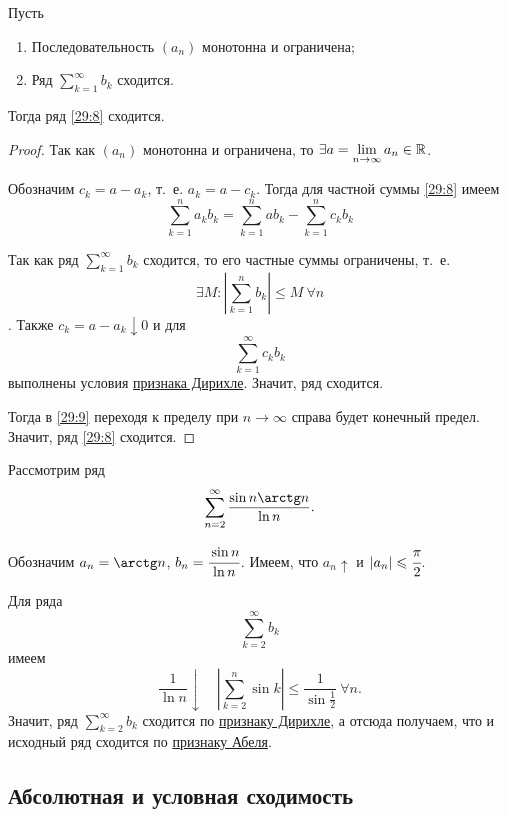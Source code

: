\documentclass[../../main.tex]{subfiles}
\begin{document}
	\begin{thm}
		\label{29:abel}
		Пусть
		\begin{enumerate}
			\item Последовательность $(a_n)$ монотонна и ограничена;
			\item Ряд $\sum\limits_{k = 1}^\infty b_k$ сходится.
		\end{enumerate}
	
		Тогда ряд \eqref{29:8} сходится.
	\end{thm}
	\begin{proof}
		Так как $(a_n)$ монотонна и ограничена, то $\exists a = 
		\lim\limits_{n\to\infty} a_n\in \R$.
		
		Обозначим $c_k = a - a_k$, т.~е. $a_k = a - c_k$. 
		Тогда для частной суммы \eqref{29:8} имеем
		\begin{equation}
			\sum_{k = 1}^n a_kb_k = \sum_{k = 1}^n ab_k - \sum_{k = 1}^n c_kb_k
			\label{29:9}
		\end{equation}
		
		Так как ряд $\sum\limits_{k = 1}^\infty b_k$ сходится, 
		то его частные суммы ограничены, т.~е. 
		\[\exists M\colon \left|\sum\limits_{k = 1}^n b_k\right|\leq M \ 
		\forall n\]. 
		Также $c_k = a - a_k \downarrow 0$ и для 
		\[\sum_{k = 1}^\infty c_kb_k\]
		выполнены условия \hyperref[29:dirichle]{признака Дирихле}. 
		Значит, ряд сходится.
		
		Тогда в \eqref{29:9} переходя к пределу при $n\to\infty$ 
		справа будет конечный предел. Значит, ряд \eqref{29:8} сходится.
	\end{proof}
	\begin{example}
		Рассмотрим ряд
		\[\sum_{n = 2}^\infty\frac{\sin n\arctg n}{\ln n}.\]
		
		Обозначим $a_n = \arctg n$, $b_n = \cfrac{\sin n}{\ln n}$. 
		Имеем, что $a_n\uparrow$ и $|a_n|\leq \cfrac{\pi}{2}$.
		
		Для ряда \[\sum_{k = 2}^\infty b_k\] 
		имеем
		\[\frac{1}{\ln n}\downarrow\quad \left|\sum_{k = 2}^n \sin k\right|
		\leq \frac{1}{\sin\frac{1}{2}}\ \forall n.\]
		Значит, ряд $\sum\limits_{k = 2}^\infty b_k$ сходится по 
		\hyperref[29:dirichle]{признаку Дирихле}, а отсюда получаем, 
		что и исходный ряд сходится по \hyperref[29:abel]{признаку Абеля}.
	\end{example}

	\subsection{Абсолютная и условная сходимость}
	
\end{document}
